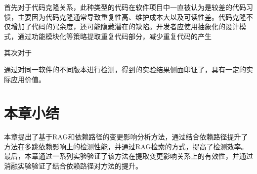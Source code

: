 首先对于代码克隆关系，此种类型的代码在软件项目中一直被认为是较差的代码习惯，主要因为代码克隆通常导致重复性高、维护成本大以及可读性差。代码克隆不仅增加了代码的冗余度，还可能隐藏潜在的缺陷。开发者应使用抽象化的设计模式，通过功能模块化等策略提取重复代码部分，减少重复代码的产生

其次对于


通过对同一软件的不同版本进行检测，得到的实验结果侧面印证了，具有一定的实际应用价值。

\section{本章小结}

本章提出了基于RAG和依赖路径的变更影响分析方法，通过结合依赖路径提升了方法在多跳依赖影响上的检测性能，并通过RAG检索的方式，提高了检测效率。最后，本章通过一系列实验验证了该方法在提取变更影响关系上的有效性，并通过消融实验验证了结合依赖路径对方法的提升。

